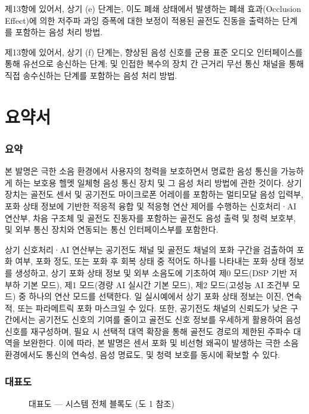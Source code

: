 \documentclass{article}
\DeclareRobustCommand{\codexedit}[1]{\textcolor{customorange}{#1}}
\DeclareRobustCommand{\vtwoedit}[1]{\textcolor{customgreen}{#1}}
\begin{document}
\begin{enumerate}[label=\textbf{[\arabic*]}]
    \item \codexedit{제13항에 있어서,
    상기 (e) 단계는, 이도 폐쇄 상태에서 발생하는 폐쇄 효과(Occlusion Effect)에 의한 저주파 과잉 증폭에 대한 보정이 적용된 골전도 진동을 출력하는 단계를 포함하는 음성 처리 방법.}

    \item \codexedit{제13항에 있어서,
    상기 (f) 단계는, 향상된 음성 신호를 군용 표준 오디오 인터페이스를 통해 유선으로 송신하는 단계; 및 인접한 복수의 장치 간 근거리 무선 통신 채널을 통해 직접 송수신하는 단계를 포함하는 음성 처리 방법.}

\end{enumerate}


\part{요약서}

\section{요약}

\vtwoedit{본 발명은 극한 소음 환경에서 사용자의 청력을 보호하면서 명료한 음성 통신을 가능하게 하는 보호용 헬멧 일체형 음성 통신 장치 및 그 음성 처리 방법에 관한 것이다. 상기 장치는 골전도 센서 및 공기전도 마이크로폰 어레이를 포함하는 멀티모달 음성 입력부, 포화 상태 정보에 기반한 적응적 융합 및 적응형 연산 제어를 수행하는 신호처리·AI 연산부, 차음 구조체 및 골전도 진동자를 포함하는 골전도 음성 출력 및 청력 보호부, 및 외부 통신 장치와 연동되는 통신 인터페이스부를 포함한다.}

\vtwoedit{상기 신호처리·AI 연산부는 공기전도 채널 및 골전도 채널의 포화 구간을 검출하여 포화 여부, 포화 정도, 또는 포화 후 회복 상태 중 적어도 하나를 나타내는 포화 상태 정보를 생성하고, 상기 포화 상태 정보 및 외부 소음도에 기초하여 제0 모드(DSP 기반 저부하 기본 모드), 제1 모드(경량 AI 실시간 기본 모드), 제2 모드(고성능 AI 조건부 모드) 중 하나의 연산 모드를 선택한다. 일 실시예에서 상기 포화 상태 정보는 이진, 연속적, 또는 파라메트릭 포화 마스크일 수 있다. 또한, 공기전도 채널의 신뢰도가 낮은 구간에서는 공기전도 신호의 기여를 줄이고 골전도 신호 정보를 우세하게 활용하여 음성 신호를 재구성하며, 필요 시 선택적 대역 확장을 통해 골전도 경로의 제한된 주파수 대역을 보완한다. 이에 따라, 본 발명은 센서 포화 및 비선형 왜곡이 발생하는 극한 소음 환경에서도 통신의 연속성, 음성 명료도, 및 청력 보호를 동시에 확보할 수 있다.}

\section{대표도}

\begin{figure}[H]
    \centering
    \resizebox{\textwidth}{!}{%
    }
    \caption*{대표도 — 시스템 전체 블록도 (도 1 참조)}
    \label{fig:representative}
\end{figure}
\end{document}
